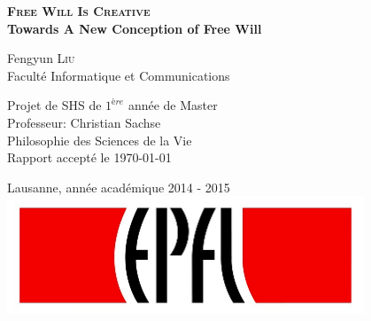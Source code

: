 \begin{titlepage}

  \begin{center}

    \vspace*{3\baselineskip}
    \textsc{\Large \bfseries Free Will Is Creative \\[0.4cm] }
    {\bfseries Towards A New Conception of Free Will \\[1.5cm] }

    \noindent
    Fengyun \textsc{Liu} \\[0.3cm]

    \noindent
    { Faculté Informatique et Communications \\[2cm]}

    \begin{framed}
    Projet de SHS de $1^{ère}$ année de Master \\
    Professeur: Christian Sachse \\
    Philosophie des Sciences de la Vie \\
    Rapport accepté le \today
    \end{framed}

    \noindent
    Lausanne, année académique 2014 - 2015 \\[1cm]

    \includegraphics[width=0.8\textwidth]{img/epfl}~\\[1cm]



  \end{center}

\end{titlepage}
